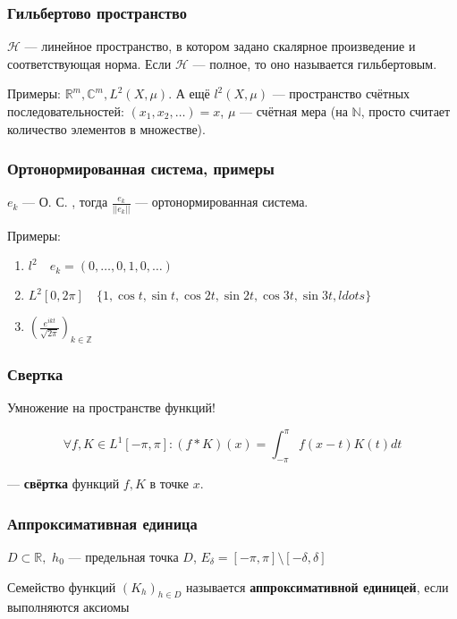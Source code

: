 \documentclass{article}
\def\dbl{\,\,}
\begin{document}
\subsubsection{Гильбертово пространство}

$\mathcal{H}$ --- линейное пространство, в котором задано скалярное произведение и соответствующая норма. Если $\mathcal{H}$ --- полное, то оно называется гильбертовым.

Примеры: $\mathbb{R}^m, \mathbb{C}^m, L^2(X, \mu)$. А ещё $l^2(X, \mu)$ --- пространство счётных последовательностей: $(x_1, x_2, \ldots) = x$, $\mu$ --- счётная мера (на $\mathbb{N}$, просто считает количество элементов в множестве).

\subsubsection{Ортонормированная система, примеры}

${e_k}$ --- О. С. , тогда ${\frac{e_k}{|| e_k ||}}$ --- ортонормированная система.

Примеры: 

\begin{enumerate}
    \item $l^2 \quad e_k = (0, \ldots, 0, 1, 0, \ldots)$
    \item $L^2[0, 2\pi] \quad \{1, \cos t, \sin t, \cos 2t, \sin 2t, \cos 3t, \sin 3t, ldots\}$
    \item $\left(\frac{e^{ikt}}{\sqrt{2\pi}}\right)_{k \in \mathbb{Z}}$
\end{enumerate}

\subsubsection{Свертка}

Умножение на пространстве функций!

\[\forall f, K \in L^1[-\pi, \pi]: (f * K)(x) = \int_{-\pi}^{\pi} f(x - t)K(t) dt\]

--- \textbf{свёртка} функций $f, K$ в точке $x$.

\subsubsection{Аппроксимативная единица}

$D \subset \mathbb{R}, \dbl h_0$ --- предельная точка $D$, $E_\delta = [-\pi, \pi] \setminus [-\delta, \delta]$

Семейство функций $(K_h)_{h \in D}$ называется \textbf{аппроксимативной единицей}, если выполняются аксиомы
\end{document}
